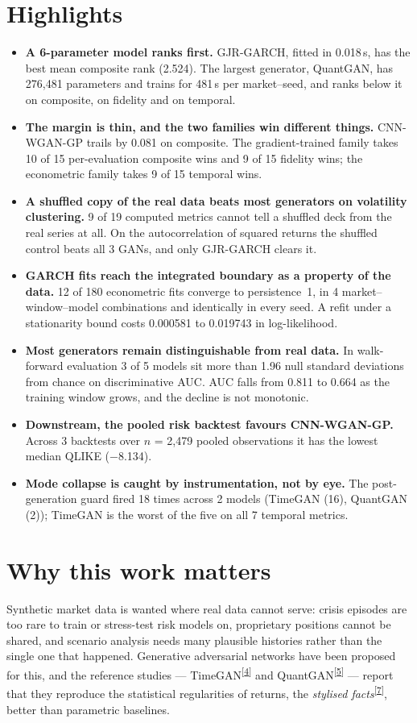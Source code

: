 \documentclass[11pt,a4paper]{article}
\makeatletter
\newcommand{\tcite}[1]{\textsuperscript{[\hyperlink{R:#1}{#1}]}}
\DeclareRobustCommand{\_}{\ifmmode\nfss@text{\textunderscore}\else\textunderscore\allowbreak\fi}
\makeatother
\begin{document}
\section{Highlights}
\label{sec:highlights}
\begin{itemize}[leftmargin=1.3em,itemsep=6pt]
\item \textbf{A 6-parameter model ranks first.} GJR-GARCH, fitted in 0.018\,s, has the best mean composite rank (2.524). The largest generator, QuantGAN, has 276,481 parameters and trains for 481\,s per market--seed, and ranks below it on composite, on fidelity and on temporal.
\item \textbf{The margin is thin, and the two families win different things.} CNN-WGAN-GP trails by 0.081 on composite. The gradient-trained family takes 10 of 15 per-evaluation composite wins and 9 of 15 fidelity wins; the econometric family takes 9 of 15 temporal wins.
\item \textbf{A shuffled copy of the real data beats most generators on volatility clustering.} 9 of 19 computed metrics cannot tell a shuffled deck from the real series at all. On the autocorrelation of squared returns the shuffled control beats all 3 GANs, and only GJR-GARCH clears it.
\item \textbf{GARCH fits reach the integrated boundary as a property of the data.} 12 of 180 econometric fits converge to persistence~1, in 4 market--window--model combinations and identically in every seed. A refit under a stationarity bound costs 0.000581 to 0.019743 in log-likelihood.
\item \textbf{Most generators remain distinguishable from real data.} In walk-forward evaluation 3 of 5 models sit more than 1.96 null standard deviations from chance on discriminative AUC. AUC falls from 0.811 to 0.664 as the training window grows, and the decline is not monotonic.
\item \textbf{Downstream, the pooled risk backtest favours CNN-WGAN-GP.} Across 3 backtests over $n$ = 2,479 pooled observations it has the lowest median QLIKE ($-$8.134).
\item \textbf{Mode collapse is caught by instrumentation, not by eye.} The post-generation guard fired 18 times across 2 models (TimeGAN (16), QuantGAN (2)); TimeGAN is the worst of the five on all 7 temporal metrics.
\end{itemize}

\section{Why this work matters}
\label{sec:why}
Synthetic market data is wanted where real data cannot serve: crisis episodes are too rare to train or stress-test risk models on, proprietary positions cannot be shared, and scenario analysis needs many plausible histories rather than the single one that happened. Generative adversarial networks have been proposed for this, and the reference studies --- TimeGAN\tcite{4} and QuantGAN\tcite{5} --- report that they reproduce the statistical regularities of returns, the \emph{stylised facts}\tcite{7}, better than parametric baselines.
\end{document}
